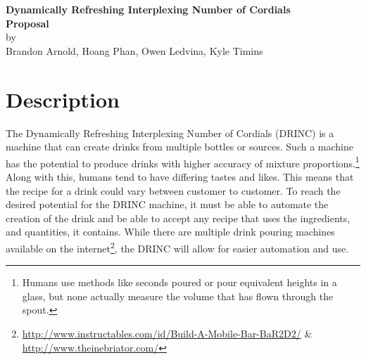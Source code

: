 \documentclass[letterpaper]{article}
\newcommand{\theTitle}{Dynamically Refreshing Interplexing Number of Cordials}
\newcommand{\subTitle}{DRINC}
\newcommand{\fNames}{Brandon Arnold, Hoang Phan, Owen Ledvina, Kyle Timins}
\begin{document}
\thispagestyle{plain}
\begin{center}
{\LARGE \textbf{\theTitle}}\\\vspace{0.5cm}
{\Large \textbf{Proposal}}\\\vspace{0.5cm}
by\\
{\large \fNames}

\end{center}

\section{Description}
The \theTitle{} (\subTitle{}) is a machine that can create drinks from
multiple bottles or sources. Such a machine has the potential to produce
drinks with higher accuracy of mixture proportions.\footnote{Humans use
methods like seconds poured or pour equivalent heights in a glass, but 
none actually measure the volume that has flown through the spout.} Along
with this, humans tend to have differing tastes and likes. This means
that the recipe for a drink could vary between customer to customer.
To reach the desired potential for the \subTitle{} machine, it must be 
able to automate the creation of the drink and be able to accept any recipe
that uses the ingredients, and quantities, it contains. While there are
multiple drink pouring machines available on the 
internet\footnote{\url{http://www.instructables.com/id/Build-A-Mobile-Bar-BaR2D2/} \& \url{http://www.theinebriator.com/}}, 
the \subTitle{} will allow for easier automation and use.
\end{document}
